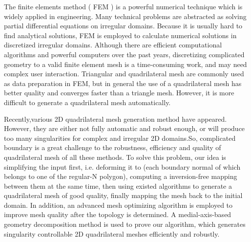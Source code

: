 \begin{enabstract}
The finite elements method  ( FEM ) is a powerful numerical technique which is widely applied in engineering.  Many technical problems are abstracted as solving partial differential equations on irregular domains. Because it is usually hard to find analytical solutions, FEM is employed to calculate numerical solutions in discretized irregular domains. Although there are efficient computational algorithms and powerful computers over the past years, discretizing complicated geometry to a valid finite element mesh is a time-consuming work, and may need complex user interaction.  Triangular and quadrilateral mesh are commonly used as data preparation in FEM, but in general the use of a quadrilateral mesh has better quality and converges faster than a triangle mesh. However, it is more difficult to generate a quadrilateral mesh automatically.

Recently,various 2D quadrilateral mesh generation method have appeared. However, they are either not fully automatic and robust enough, or will produce too many singularities for complex and irregular 2D domains.So,     complicated boundary is a great challenge to the robustness, efficiency and quality of quadrilateral mesh of all these methods. To solve this problem, our idea is simplifying the input first, i.e. deforming it to (each boundary normal of which belongs to one of the regular-N polygon), computing a inversion-free mapping between them at the same time, then using existed algorithms to generate a quadrilateral mesh of good quality, finally mapping the mesh back to the initial domain. In addition, an advanced mesh optimizing algorithm is employed to improve mesh quality after the topology is determined.  A medial-axis-based geometry decomposition method is used to prove our algorithm, which generates singularity controllable 2D quadrilateral meshes efficiently and robustly.

\end{enabstract}
